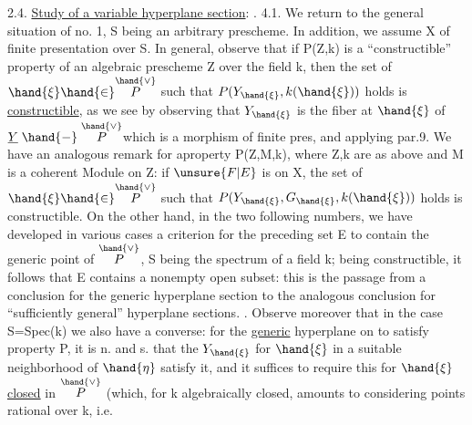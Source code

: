 2.4. \uline{Study of a variable hyperplane section}: .
4.1.
We return to the general situation of no. 1, S being an arbitrary
prescheme. In addition, we assume X of finite presentation over S.
In general, observe that if P(Z,k) is a “constructible” property
 of an algebraic prescheme Z over the field k,
then the set of $\hand{\xi} \hand{\in} \overset{\hand{\vee}}{P}$ such that $P(Y_{\hand{\xi}},k(\hand{\xi}))$ holds is \uline{constructible},
as we see by observing that $Y_{\hand{\xi}}$ is the fiber at $\hand{\xi}$ of $\underline{Y} \mathrel{\hand{-}} \overset{\hand{\vee}}{P}$\hand{,}which
is a morphism of finite pres, and applying par.9. We have an
analogous remark for a\hand{|}property P(Z,M,k), where Z,k are as above
and M is a coherent Module on Z: if $\unsure{F|E}$ is  on X, the set
of $\hand{\xi} \hand{\in} \overset{\hand{\vee}}{P}$ such that $P(Y_{\hand{\xi}},G_{\hand{\xi}},k(\hand{\xi}))$ holds is constructible. On the other
hand, in the two following numbers, we have developed  in various
cases a criterion for the preceding set E to contain the generic
point of $\overset{\hand{\vee}}{P}$, S being the spectrum of a field k; being constructible,
it follows that E contains a nonempty open subset: this is the passage from a
conclusion for the generic hyperplane section to the analogous conclusion for “sufficiently general” hyperplane sections.  \hand{[}\hand{]}. Observe moreover that 
in the case S=Spec(k) we also have a converse: for the \uline{generic} hyperplane
on to satisfy property P, it is n. and s. that
the $Y_{\hand{\xi}}$ for $\hand{\xi}$ in a suitable neighborhood of $\hand{\eta}$ satisfy it, and it
suffices to require this for $\hand{\xi}$ \uline{closed} in $\overset{\hand{\vee}}{P}$ (which, for k algebraically
closed, amounts to considering points rational over k, i.e.


